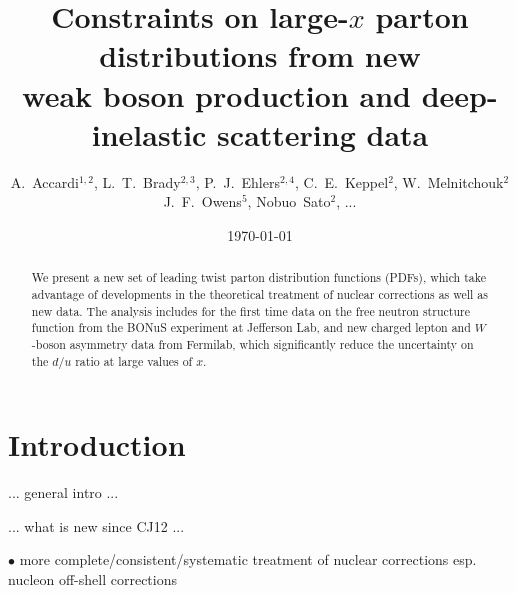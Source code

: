 \documentclass[aps,prd,amsmath,preprint]{revtex4}
\begin{document}
\title{Constraints on large-$x$ parton distributions from new \\
	weak boson production and deep-inelastic scattering data}

\author{A.~Accardi$^{1,2}$,
	L.~T.~Brady$^{2,3}$,
	P.~J.~Ehlers$^{2,4}$,
	C.~E.~Keppel$^2$,
	W.~Melnitchouk$^2$
	J.~F.~Owens$^5$,
	Nobuo~Sato$^2$, ...}



\date{\today}

\begin{abstract}
We present a new set of leading twist parton distribution functions
(PDFs), which take advantage of developments in the theoretical
treatment of nuclear corrections as well as new data.
The analysis includes for the first time data on the free neutron
structure function from the BONuS experiment at Jefferson Lab,
and new charged lepton and $W$-boson asymmetry data from Fermilab,
which significantly reduce the uncertainty on the $d/u$ ratio at
large values of $x$.
%
\end{abstract}

\maketitle


\section{Introduction}
\label{sec:intro}

... general intro ...

... what is new since CJ12 ...

$\bullet$
more complete/consistent/systematic treatment of nuclear corrections
esp. nucleon off-shell corrections
\end{document}
